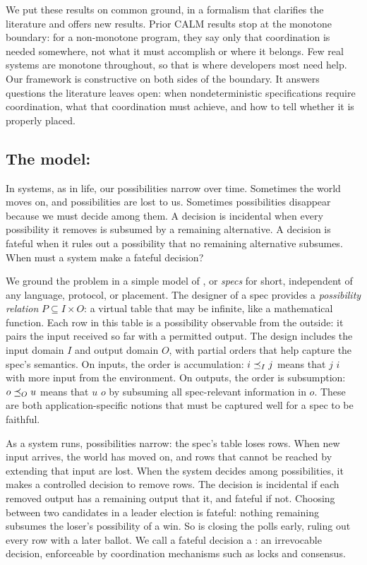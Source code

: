 We put these results on common ground, in a formalism that clarifies the
literature and offers new results.  Prior CALM results stop at the monotone
boundary: for a non-monotone program, they say only that coordination is needed
somewhere, not what it must accomplish or where it belongs.  Few real systems
are monotone throughout, so that is where developers most need help.  Our
framework is constructive on both sides of the boundary.  It answers questions
the literature leaves open: when nondeterministic specifications require
coordination, what that coordination must achieve, and how to tell whether it is
properly placed.

\subsection{The model: \Spectype[s]}
In systems, as in life, our possibilities narrow over time. Sometimes the world
moves on, and possibilities are lost to us. Sometimes possibilities disappear
because we must decide among them. A decision is incidental when
every possibility it removes is subsumed by a remaining alternative. A
decision is fateful when it rules out a possibility that no remaining alternative subsumes. When must a system make a fateful decision?

We ground the problem in a simple model of \emph{\spectype[s]}, or \emph{specs}
for short, independent of any language, protocol, or placement. The designer of
a spec provides a \emph{possibility relation} $P\subseteq I\times O$: a virtual
table that may be infinite, like a mathematical function. Each row in this table
is a possibility observable from the outside: it pairs the input received so far
with a permitted output. The design includes the input domain $I$ and output domain $O$,
with partial orders that help capture the spec's semantics.  On inputs, the order
is accumulation: $i\preceq_I j$ means that $j$ \emph{\inrel} $i$ with more input
from the environment.  On outputs, the order is subsumption: $o\preceq_O u$
means that  $u$ \emph{\outrel} $o$ by subsuming all spec-relevant information in
$o$. These are both application-specific notions that must be captured well for
a spec to be faithful.

As a system runs, possibilities narrow: the spec's table loses rows.  When new
input arrives, the world has moved on, and rows that cannot be reached by
extending that input are lost.  When the system decides among possibilities, it
makes a controlled decision to remove rows.  The decision is incidental if each
removed output has a remaining output that \outrel it, and fateful if
not.  Choosing between two candidates in a leader election is fateful: nothing
remaining subsumes the loser's possibility of a win.  So is closing the polls early,
ruling out every row with a later ballot.  We call a fateful decision a
\emph{\commitment}: an irrevocable decision, enforceable by coordination
mechanisms such as locks and consensus.

